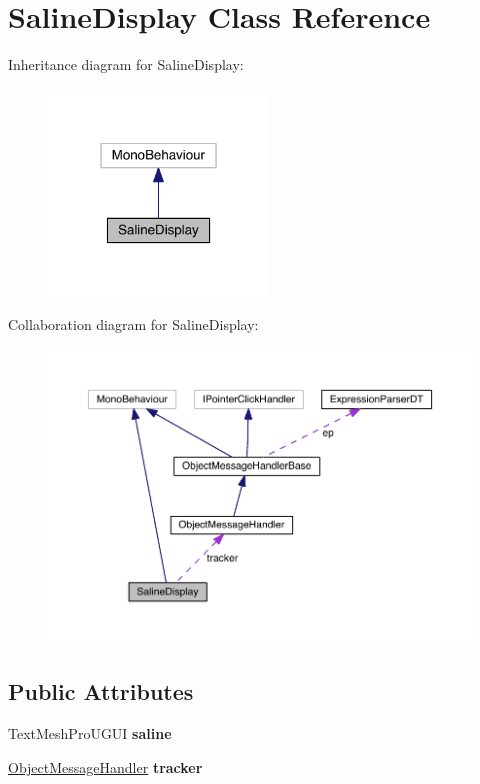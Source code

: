 \hypertarget{class_saline_display}{}\section{Saline\+Display Class Reference}
\label{class_saline_display}


Inheritance diagram for Saline\+Display\+:\nopagebreak
\begin{figure}[H]
\begin{center}
\leavevmode
\includegraphics[width=166pt]{class_saline_display__inherit__graph}
\end{center}
\end{figure}


Collaboration diagram for Saline\+Display\+:\nopagebreak
\begin{figure}[H]
\begin{center}
\leavevmode
\includegraphics[width=350pt]{class_saline_display__coll__graph}
\end{center}
\end{figure}
\subsection*{Public Attributes}
\begin{DoxyCompactItemize}
\item 
Text\+Mesh\+Pro\+U\+G\+UI {\bfseries saline}\hypertarget{class_saline_display_acad6e775501e0b18482b9e8e93b72d01}{}\label{class_saline_display_acad6e775501e0b18482b9e8e93b72d01}

\item 
\hyperlink{class_object_message_handler}{Object\+Message\+Handler} {\bfseries tracker}\hypertarget{class_saline_display_ae26891f19245c29cb8d65f251d2b2ab7}{}\label{class_saline_display_ae26891f19245c29cb8d65f251d2b2ab7}

\end{DoxyCompactItemize}


